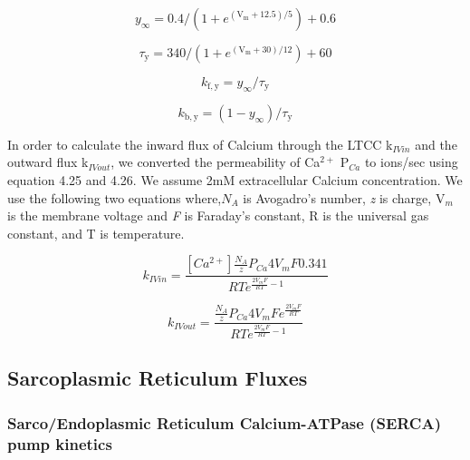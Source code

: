 \documentclass[12pt]{ucsddissertation}
\begin{document}
\begin{equation}
y _ { \infty } = 0.4 / \left( 1 + e ^ { \left( \mathrm { V } _ { \mathrm { m } } + 12.5 \right) / 5 } \right) + 0.6
\end{equation}

\begin{equation}
\tau _ { \mathrm { y } } = 340 / \left( 1 + e ^ { \left( \mathrm { V } _ { \mathrm { m } } + 30 \right) / 12 } \right) + 60
\end{equation}

\begin{equation}
k _ { \mathrm { f } , \mathrm { y } } = y _ { \infty } / \tau _ { \mathrm { y } }
\end{equation}

\begin{equation}
k _ { \mathrm { b } , \mathrm { y } } = \left( 1 - y _ { \infty } \right) / \tau _ { \mathrm { y } }
\end{equation}


In order to calculate the inward flux of Calcium through the LTCC k$_{IVin}$ and the outward flux k$_{IVout}$, we  converted the permeability of Ca$^{2+}$ P$_{Ca}$ to ions/sec using equation 4.25 and 4.26. We assume 2mM extracellular Calcium concentration. We use the following two equations where,$N_{A}$ is Avogadro's number, \textit{z} is charge,  V$_{m}$ is the membrane voltage and \textit{F} is Faraday's constant, R is the universal gas constant, and T is temperature. 


\begin{equation}
 k_{IVin} =\frac {[Ca^{2+}] \frac{N_{A}}{z} P_{Ca}4V_{m}F0.341}{RTe^{\frac {2V_{m}F}{RT}-1}}
\end{equation}


\begin{equation}
 k_{IVout} =\frac {\frac{N_{A}}{z} P_{Ca}4V_{m}Fe^{\frac {2V_{m}F}{RT}}}{RTe^{\frac {2V_{m}F}{RT}-1}}
\end{equation}





\subsection{Sarcoplasmic Reticulum Fluxes}
\subsubsection{Sarco/Endoplasmic Reticulum Calcium-ATPase (SERCA) pump kinetics}
\end{document}
